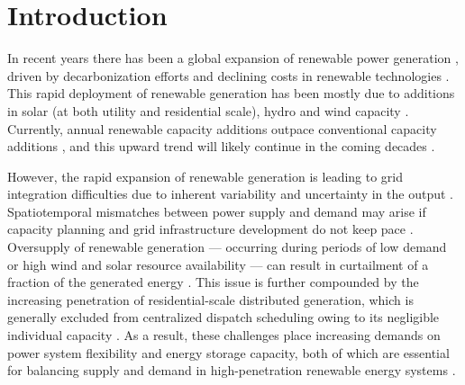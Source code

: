 \documentclass[a4paper,fleqn]{cas-dc}
\begin{document}
\section{Introduction}\label{Introduction}

In recent years there has been a global expansion of renewable power generation \cite{shahbaz2023exploring, hassan2024comprehensive}, driven by decarbonization efforts and declining costs in renewable technologies \cite{jager2025snapshot, joshi2025review, manservigi2026unlocking}. This rapid deployment of renewable generation has been mostly due to additions in solar (at both utility and residential scale), hydro and wind capacity \cite{shahbaz2023exploring, hassan2024comprehensive}. Currently, annual renewable capacity additions outpace conventional capacity additions \cite{IRENA2025}, and this upward trend will likely continue in the coming decades \cite{international2019future, raturi2021}.

However, the rapid expansion of renewable generation is leading to grid integration difficulties due to inherent variability and uncertainty in the output \cite{li2015comprehensive, liu2023balancing}. Spatiotemporal mismatches between power supply and demand may arise if capacity planning and grid infrastructure development do not keep pace \cite{ming2013overall, bird2016wind, o2020too,li2024promoting}. Oversupply of renewable generation — occurring during periods of low demand or high wind and solar resource availability — can result in curtailment of a fraction of the generated energy \cite{denholm2015overgeneration, bird2016wind, o2020too}. This issue is further compounded by the increasing penetration of residential-scale distributed generation, which is generally excluded from centralized dispatch scheduling owing to its negligible individual capacity \cite{li2015comprehensive, bhattarai2022assay}. As a result, these challenges place increasing demands on power system flexibility and energy storage capacity, both of which are essential for balancing supply and demand in high-penetration renewable energy systems \cite{denholm2019timescales,liu2023balancing,nejla2025overcoming}.
\end{document}
